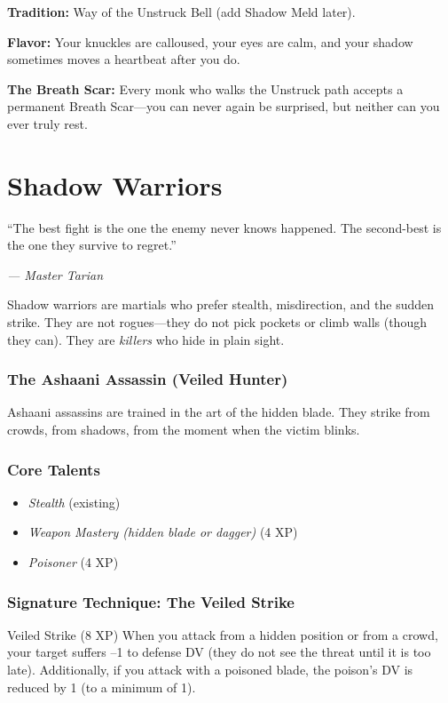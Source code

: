 \documentclass[9pt,a5paper]{extbook}
\begin{document}
\noindent
\textbf{Tradition:} Way of the Unstruck Bell (add Shadow Meld later).

\noindent
\textbf{Flavor:} Your knuckles are calloused, your eyes are calm, and your shadow sometimes moves a heartbeat after you do.

\noindent
\textbf{The Breath Scar:} Every monk who walks the Unstruck path accepts a permanent Breath Scar---you can never again be surprised, but neither can you ever truly rest.

\clearpage

\chapter{Shadow Warriors}
\epigraph{``The best fight is the one the enemy never knows happened. The second-best is the one they survive to regret.''}{\textit{--- Master Tarian}}

Shadow warriors are martials who prefer stealth, misdirection, and the sudden strike. They are not rogues---they do not pick pockets or climb walls (though they can). They are \textit{killers} who hide in plain sight.

\subsection{The Ashaani Assassin (Veiled Hunter)}

Ashaani assassins are trained in the art of the hidden blade. They strike from crowds, from shadows, from the moment when the victim blinks.

\subsection{Core Talents}
\begin{itemize}
    \item \textit{Stealth} (existing)
    \item \textit{Weapon Mastery (hidden blade or dagger)} (4 XP)
    \item \textit{Poisoner} (4 XP)
\end{itemize}

\subsection{Signature Technique: The Veiled Strike}

\begin{talentbox}{Veiled Strike (8 XP)}
When you attack from a hidden position or from a crowd, your target suffers --1 to defense DV (they do not see the threat until it is too late). Additionally, if you attack with a poisoned blade, the poison's DV is reduced by 1 (to a minimum of 1).
\end{talentbox}
\end{document}
